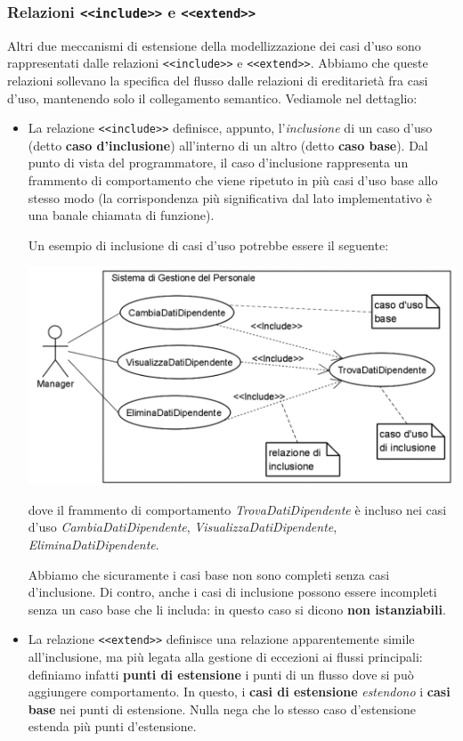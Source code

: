 \documentclass[a4paper,11pt]{article}
\begin{document}
\subsubsection{Relazioni \lstinline|<<include>>| e \lstinline|<<extend>>|}
Altri due meccanismi di estensione della modellizzazione dei casi d'uso sono rappresentati dalle relazioni \lstinline|<<include>>| e \lstinline|<<extend>>|. Abbiamo che queste relazioni sollevano la specifica del flusso dalle relazioni di ereditarietà fra casi d'uso, mantenendo solo il collegamento semantico. Vediamole nel dettaglio:
\begin{itemize}
	\item La relazione \lstinline|<<include>>| definisce, appunto, l'\textit{inclusione} di un caso d'uso (detto \textbf{caso d'inclusione}) all'interno di un altro (detto \textbf{caso base}). Dal punto di vista del programmatore, il caso d'inclusione rappresenta un frammento di comportamento che viene ripetuto in più casi d'uso base allo stesso modo (la corrispondenza più significativa dal lato implementativo è una banale chiamata di funzione).

		Un esempio di inclusione di casi d'uso potrebbe essere il seguente:
\begin{center}
	\includegraphics[scale=0.25]{../figures/include_casi_uso.png}
\end{center}
		dove il frammento di comportamento \textit{TrovaDatiDipendente} è incluso nei casi d'uso \textit{CambiaDatiDipendente}, \textit{VisualizzaDatiDipendente}, \textit{EliminaDatiDipendente}.

		Abbiamo che sicuramente i casi base non sono completi senza casi d'inclusione. Di contro, anche i casi di inclusione possono essere incompleti senza un caso base che li includa: in questo caso si dicono \textbf{non istanziabili}.

	\item La relazione \lstinline|<<extend>>| definisce una relazione apparentemente simile all'inclusione, ma più legata alla gestione di eccezioni ai flussi principali: definiamo infatti \textbf{punti di estensione} i punti di un flusso dove si può aggiungere comportamento. In questo, i \textbf{casi di estensione} \textit{estendono} i \textbf{casi base} nei punti di estensione. Nulla nega che lo stesso caso d'estensione estenda più punti d'estensione.


\end{itemize}
\end{document}
